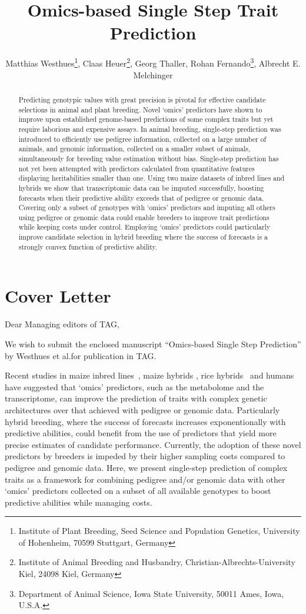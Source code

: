 \documentclass[12pt,titlepage]{article}
\title{Omics-based Single Step Trait Prediction}
\author{
  Matthias Westhues\thanks{Institute of Plant Breeding, Seed Science and Population Genetics, University of Hohenheim, 70599 Stuttgart, Germany},
  Claas Heuer\thanks{Institute of Animal Breeding and Husbandry, Christian-Albrechts-University Kiel, 24098 Kiel, Germany},
  Georg Thaller\samethanks[2],
  Rohan Fernando\thanks{Department of Animal Science, Iowa State University, 50011 Ames, Iowa, U.S.A.},
  Albrecht E. Melchinger\samethanks[1]
}
\begin{document}
\maketitle
\doublespacing
\linenumbers



\begin{abstract}
Predicting genotypic values with great precision is pivotal for effective
candidate selections in animal and plant breeding.
Novel `omics' predictors have shown to improve upon established genome-based
predictions of some complex traits but yet require laborious and expensive
assays.
In animal breeding, single-step prediction was introduced to efficiently use
pedigree information, collected on a large number of animals, and genomic
information, collected on a smaller subset of animals, simultaneously for breeding
value estimation without bias.
Single-step prediction has not yet been attempted with predictors calculated from
quantitative features displaying heritabilities smaller than one.
Using two maize datasets of inbred lines and hybrids we show that transcriptomic
data can be imputed successfully, boosting forecasts when their predictive
ability exceeds that of pedigree or genomic data.
Covering only a subset of genotypes with `omics' predictors and imputing all
others using pedigree or genomic data could enable breeders to improve trait
predictions while keeping costs under control.
Employing `omics' predictors could particularly improve candidate selection in
hybrid breeding where the success of forecasts is a strongly convex function of
predictive ability.
\end{abstract}


\section{Cover Letter}
Dear Managing editors of TAG,

We wish to submit the enclosed manuscript ``Omics-based Single Step Prediction''
by Westhues et al.\@ for publication in TAG.

Recent studies in maize inbred lines~\cite{Guo2016}, maize hybrids
\cite{Zenke-Philippi2017,Westhues2017}, rice hybrids~\cite{Dan2016,Xu2016} and
humans~\cite{Vazquez2016} have suggested that `omics' predictors, such as the
metabolome and the transcriptome, can improve the prediction of traits with
complex genetic architectures over that achieved with pedigree or genomic data.
Particularly hybrid breeding, where the success of forecasts increases
exponentionally with predictive abilities, could benefit from the use of
predictors that yield more precise estimates of candidate performance.
Currently, the adoption of these novel predictors by breeders is impeded
by their higher sampling costs compared to pedigree and genomic data.
Here, we present single-step prediction of complex traits as a framework for
combining pedigree and/or genomic data with other `omics' predictors collected
on a subset of all available genotypes to boost predictive abilities while
managing costs.
\end{document}
